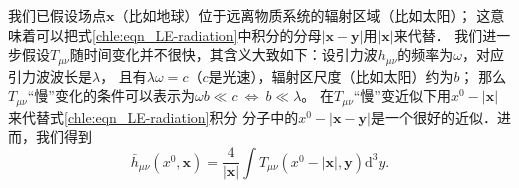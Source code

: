 我们已假设场点$\boldsymbol{x}$（比如地球）位于远离物质系统的辐射区域（比如太阳）；
这意味着可以把式\eqref{chle:eqn_LE-radiation}中积分的分母$\left|\boldsymbol{x}-\boldsymbol{y}\right|$用$|\boldsymbol{x}|$来代替．
我们进一步假设$T_{\mu \nu}$随时间变化并不很快，其含义大致如下：设引力波$h_{\mu\nu}$的频率为$\omega$，对应引力波波长是$\lambda$，
且有$\lambda \omega =c$（$c$是光速），辐射区尺度（比如太阳）约为$b$；
那么$T_{\mu \nu}$“慢”变化的条件可以表示为$\omega b \ll c \ \Leftrightarrow \  b \ll \lambda $。
在$T_{\mu \nu}$“慢”变近似下用$x^0-|\boldsymbol{x}|$来代替式\eqref{chle:eqn_LE-radiation}积分
分子中的$x^0-\left|\boldsymbol{x}-\boldsymbol{y}\right|$是一个很好的近似．进而，我们得到
\begin{equation}\label{chle:eqn_LE-radiation-approx}
	\bar{h}_{\mu \nu}(x^0, \boldsymbol{x}) 	= \frac{4}{|\boldsymbol{x}|} \int T_{\mu \nu} 
	\left(x^0-|\boldsymbol{x}|, \boldsymbol{y}\right) \mathrm{d}^{3} y .
\end{equation}


